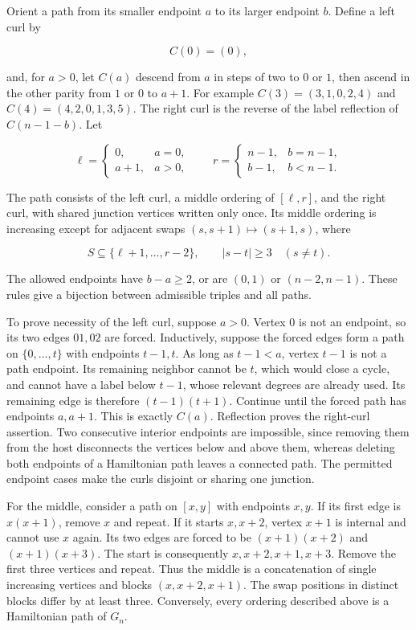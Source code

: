 \documentclass[11pt,a4paper]{article}
\begin{document}
Orient a path from its smaller endpoint \(a\) to its larger endpoint \(b\). Define a left curl by

\[ C(0)=(0), \]

and, for \(a>0\), let \(C(a)\) descend from \(a\) in steps of two to \(0\) or \(1\), then ascend in the other parity from \(1\) or \(0\) to \(a+1\). For example \(C(3)=(3,1,0,2,4)\) and \(C(4)=(4,2,0,1,3,5)\). The right curl is the reverse of the label reflection of \(C(n-1-b)\). Let

\[\ell=\begin{cases}0,&a=0,\\a+1,&a>0,\end{cases}\qquad
r=\begin{cases}n-1,&b=n-1,\\b-1,&b<n-1.\end{cases}\]

The path consists of the left curl, a middle ordering of \([\ell,r]\), and the right curl, with shared junction vertices written only once. Its middle ordering is increasing except for adjacent swaps \((s,s+1)\mapsto(s+1,s)\), where

\[ S\subseteq\{\ell+1,\ldots,r-2\},\qquad
|s-t|\ge3\quad(s\ne t). \]

The allowed endpoints have \(b-a\ge2\), or are \((0,1)\) or \((n-2,n-1)\). These rules give a bijection between admissible triples and all paths.

To prove necessity of the left curl, suppose \(a>0\). Vertex \(0\) is not an endpoint, so its two edges \(01,02\) are forced. Inductively, suppose the forced edges form a path on \(\{0,\ldots,t\}\) with endpoints \(t-1,t\). As long as \(t-1<a\), vertex \(t-1\) is not a path endpoint. Its remaining neighbor cannot be \(t\), which would close a cycle, and cannot have a label below \(t-1\), whose relevant degrees are already used. Its remaining edge is therefore \((t-1)(t+1)\). Continue until the forced path has endpoints \(a,a+1\). This is exactly \(C(a)\). Reflection proves the right-curl assertion. Two consecutive interior endpoints are impossible, since removing them from the host disconnects the vertices below and above them, whereas deleting both endpoints of a Hamiltonian path leaves a connected path. The permitted endpoint cases make the curls disjoint or sharing one junction.

For the middle, consider a path on \([x,y]\) with endpoints \(x,y\). If its first edge is \(x(x+1)\), remove \(x\) and repeat. If it starts \(x,x+2\), vertex \(x+1\) is internal and cannot use \(x\) again. Its two edges are forced to be \((x+1)(x+2)\) and \((x+1)(x+3)\). The start is consequently \(x,x+2,x+1,x+3\). Remove the first three vertices and repeat. Thus the middle is a concatenation of single increasing vertices and blocks \((x,x+2,x+1)\). The swap positions in distinct blocks differ by at least three. Conversely, every ordering described above is a Hamiltonian path of \(G_n\).
\end{document}
